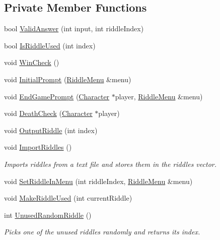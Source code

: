 \subsection*{Private Member Functions}
\begin{DoxyCompactItemize}
\item 
bool \hyperlink{classCodeCracker_aeddf29fcc2034f0acb41d41e0f755a3c}{Valid\-Answer} (int input, int riddle\-Index)
\item 
bool \hyperlink{classCodeCracker_a5540b8495c5f97f92cdb9b56a6005e6a}{Is\-Riddle\-Used} (int index)
\item 
void \hyperlink{classCodeCracker_a3177ddb9deb208ac462d55970b112626}{Win\-Check} ()
\item 
void \hyperlink{classCodeCracker_a879d3725e5602f6a5feddc39808f49b2}{Initial\-Prompt} (\hyperlink{classRiddleMenu}{Riddle\-Menu} \&menu)
\item 
void \hyperlink{classCodeCracker_a0f224858393bc3c597bd81babc87764b}{End\-Game\-Prompt} (\hyperlink{classCharacter}{Character} $\ast$player, \hyperlink{classRiddleMenu}{Riddle\-Menu} \&menu)
\item 
void \hyperlink{classCodeCracker_aa3e32b1d98fe1935315d02c832877e33}{Death\-Check} (\hyperlink{classCharacter}{Character} $\ast$player)
\item 
void \hyperlink{classCodeCracker_a02a6f156f051feca5691b8a4c4f44310}{Output\-Riddle} (int index)
\item 
void \hyperlink{classCodeCracker_a13ef45a98032d321c825e7a2c5439a33}{Import\-Riddles} ()
\begin{DoxyCompactList}\small\item\em Imports riddles from a text file and stores them in the riddles vector. \end{DoxyCompactList}\item 
void \hyperlink{classCodeCracker_a98c0c73ba7bc17e56a8a913ada09955f}{Set\-Riddle\-In\-Menu} (int riddle\-Index, \hyperlink{classRiddleMenu}{Riddle\-Menu} \&menu)
\item 
void \hyperlink{classCodeCracker_a23587f975c42657b90e78d00cf93bd38}{Make\-Riddle\-Used} (int current\-Riddle)
\item 
int \hyperlink{classCodeCracker_a55bebba723a92d780659f016e9e394e4}{Unused\-Random\-Riddle} ()
\begin{DoxyCompactList}\small\item\em Picks one of the unused riddles randomly and returns its index. \end{DoxyCompactList}\end{DoxyCompactItemize}
